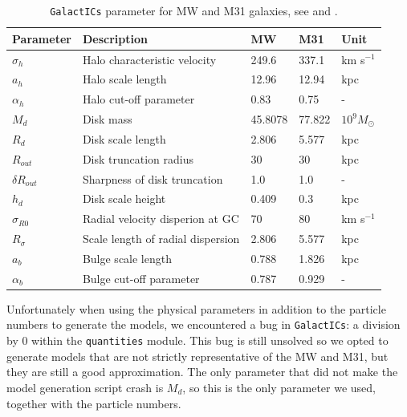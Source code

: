 \documentclass[a4paper,12pt, english]{article}
\begin{document}
\begin{table}[]
\begin{tabular}{l|l|l|l|l}
Parameter          & Description                       & MW      & M31    & Unit               \\ \hline
\(\sigma_{h}\)     & Halo characteristic velocity      & 249.6   & 337.1  & km s\(^{-1}\)      \\
\(a_{h}\)          & Halo scale length                 & 12.96   & 12.94  & kpc                \\
\(\alpha_{h}\)      & Halo cut-off parameter            & 0.83    & 0.75   & -                  \\
\(M_{d}\)          & Disk mass                         & 45.8078 & 77.822 & \(10^9 M_{\odot}\) \\
\(R_{d}\)          & Disk scale length                 & 2.806   & 5.577  & kpc                \\
\(R_{out}\)        & Disk truncation radius            & 30      & 30     & kpc                \\
\(\delta R_{out}\) & Sharpness of disk truncation           & 1.0     & 1.0    & -                  \\
\(h_{d}\)          & Disk scale height                 & 0.409   & 0.3    & kpc                \\
\(\sigma_{R0}\)    & Radial velocity disperion at GC   & 70      & 80     & km s\(^{-1}\)      \\
\(R_{\sigma}\)     & Scale length of radial dispersion & 2.806   & 5.577  & kpc                \\
\(a_{b}\)          & Bulge scale length                & 0.788   & 1.826  & kpc                \\
\(\alpha_{b}\)     & Bulge cut-off parameter           & 0.787   & 0.929  & -                  \\ \hline 
\end{tabular}
\caption{\texttt{GalactICs} parameter for MW and M31 galaxies, see \textcite{Widrow_2005} and \textcite{Withagen_2019}.}
\label{gal-param}
\end{table}
\smallskip
Unfortunately when using the physical parameters in addition to the particle numbers to generate the models, we encountered a bug in \texttt{GalactICs}: a division by 0 within the \texttt{quantities} module. This bug is still unsolved so we opted to generate models that are not strictly representative of the MW and M31, but they are still a good approximation. The only parameter that did not make the model generation script crash is \(M_{d}\), so this is the only parameter we used, together with the particle numbers.\par
\end{document}
